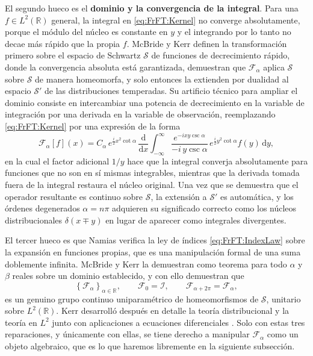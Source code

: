 			El segundo hueco es el \textbf{dominio y la convergencia de la integral}. Para una $f\in L^{2}(\mathbb{R})$ general, la integral en \eqref{eq:FrFT:Kernel} no converge absolutamente, porque el módulo del núcleo es constante en $y$ y el integrando por lo tanto no decae más rápido que la propia $f$. McBride y Kerr definen la transformación primero sobre el espacio de Schwartz $\mathcal{S}$ de funciones de decrecimiento rápido, donde la convergencia absoluta está garantizada, demuestran que $\mathcal{F}_{\alpha}$ aplica $\mathcal{S}$ sobre $\mathcal{S}$ de manera homeomorfa, y solo entonces la extienden por dualidad al espacio $\mathcal{S}'$ de las distribuciones temperadas. Su artificio técnico para ampliar el dominio consiste en intercambiar una potencia de decrecimiento en la variable de integración por una derivada en la variable de observación, reemplazando \eqref{eq:FrFT:Kernel} por una expresión de la forma
			\begin{equation}\label{eq:FrFT:MKForm}
				\mathcal{F}_{\alpha}[f](x) = C_{\alpha}\,e^{\frac{i}{2}x^{2}\cot\alpha}\,\frac{\mathrm{d}}{\mathrm{d}x}\int_{-\infty}^{\infty}\frac{e^{-ixy\csc\alpha}}{-i\,y\csc\alpha}\,e^{\frac{i}{2}y^{2}\cot\alpha}f(y)\,\mathrm{d}y,
			\end{equation}
			en la cual el factor adicional $1/y$ hace que la integral converja absolutamente para funciones que no son en sí mismas integrables, mientras que la derivada tomada fuera de la integral restaura el núcleo original. Una vez que se demuestra que el operador resultante es continuo sobre $\mathcal{S}$, la extensión a $\mathcal{S}'$ es automática, y los órdenes degenerados $\alpha = n\pi$ adquieren su significado correcto como los núcleos distribucionales $\delta(x\mp y)$ en lugar de aparecer como integrales divergentes.

			El tercer hueco es que Namias verifica la ley de índices \eqref{eq:FrFT:IndexLaw} sobre la expansión en funciones propias, que es una manipulación formal de una suma doblemente infinita. McBride y Kerr la demuestran como teorema para todo $\alpha$ y $\beta$ reales sobre un dominio establecido, y con ello demuestran que
			\begin{equation}\label{eq:FrFT:Group}
				\left\{\mathcal{F}_{\alpha}\right\}_{\alpha\in\mathbb{R}}, \qquad \mathcal{F}_{0} = \mathcal{I}, \qquad \mathcal{F}_{\alpha+2\pi} = \mathcal{F}_{\alpha},
			\end{equation}
			es un genuino grupo continuo uniparamétrico de homeomorfismos de $\mathcal{S}$, unitario sobre $L^{2}(\mathbb{R})$. Kerr desarrolló después en detalle la teoría distribucional \citep{kerr1988distributional} y la teoría en $L^{2}$ junto con aplicaciones a ecuaciones diferenciales \citep{kerr1988namias}. Solo con estas tres reparaciones, y únicamente con ellas, se tiene derecho a manipular $\mathcal{F}_{\alpha}$ como un objeto algebraico, que es lo que haremos libremente en la siguiente subsección.

